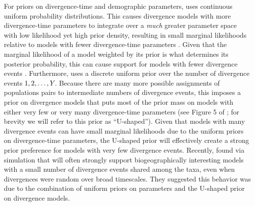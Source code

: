 For priors on divergence-time and demographic parameters, \msb uses continuous
uniform probability distributions.
This causes divergence models with more divergence-time parameters to integrate
over a \emph{much} greater parameter space with low likelihood yet high prior
density, resulting in small marginal likelihoods relative to models with fewer
divergence-time parameters \citep{Jeffreys1939,Lindley1957}.
Given that the marginal likelihood of a model weighted by its prior is what
determines its posterior probability, this can cause support for models with
fewer divergence events \citep{Oaks2012}.
Furthermore, \msb uses a discrete uniform prior over the number of divergence
events $1,2,\ldots,Y_{}$.
Because there are many more possible assignments of populations pairs to
intermediate numbers of divergence events, this imposes a prior on divergence
models that puts most of the prior mass on models with either very few or very
many divergence-time parameters (see Figure 5 of \citet{Oaks2012}; for brevity
we will refer to this prior as ``U-shaped'').
Given that models with many divergence events can have small marginal
likelihoods due to the uniform priors on divergence-time parameters, the
U-shaped prior will effectively create a strong prior preference for models
with very few divergence events.
Recently, \citet{Oaks2012} found via simulation that \msb will often strongly
support biogeographically interesting models with a small number of divergence
events shared among the taxa, even when divergences were random over broad
timescales.
They suggested this behavior was due to the combination of uniform priors on
parameters and the U-shaped prior on divergence models.


